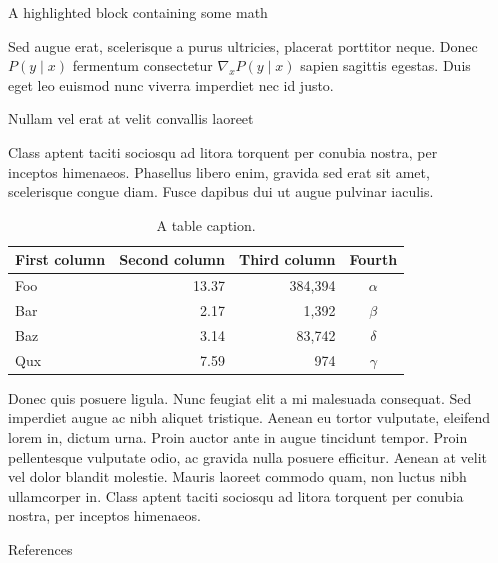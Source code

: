 \documentclass[final]{beamer}
\newlength{\sepwidth}
\newlength{\colwidth}
\newcommand{\separatorcolumn}{\begin{column}{\sepwidth}\end{column}}
\begin{document}
\begin{frame}[t]
\begin{columns}[t]
\begin{column}{\colwidth}
\begin{exampleblock}{A highlighted block containing some math}
					
					Sed augue erat, scelerisque a purus ultricies, placerat porttitor neque.
					Donec $P(y \mid x)$ fermentum consectetur $\nabla_x P(y \mid x)$ sapien
					sagittis egestas. Duis eget leo euismod nunc viverra imperdiet nec id
					justo.
					
				\end{exampleblock}
				
				\begin{block}{Nullam vel erat at velit convallis laoreet}
					
					Class aptent taciti sociosqu ad litora torquent per conubia nostra, per
					inceptos himenaeos. Phasellus libero enim, gravida sed erat sit amet,
					scelerisque congue diam. Fusce dapibus dui ut augue pulvinar iaculis.
					
					\begin{table}
						\centering
						\begin{tabular}{l r r c}
							\toprule
							\textbf{First column} & \textbf{Second column} & \textbf{Third column} & \textbf{Fourth} \\
							\midrule
							Foo & 13.37 & 384,394 & $\alpha$ \\
							Bar & 2.17 & 1,392 & $\beta$ \\
							Baz & 3.14 & 83,742 & $\delta$ \\
							Qux & 7.59 & 974 & $\gamma$ \\
							\bottomrule
						\end{tabular}
						\caption{A table caption.}
					\end{table}
					
					Donec quis posuere ligula. Nunc feugiat elit a mi malesuada consequat. Sed
					imperdiet augue ac nibh aliquet tristique. Aenean eu tortor vulputate,
					eleifend lorem in, dictum urna. Proin auctor ante in augue tincidunt
					tempor. Proin pellentesque vulputate odio, ac gravida nulla posuere
					efficitur. Aenean at velit vel dolor blandit molestie. Mauris laoreet
					commodo quam, non luctus nibh ullamcorper in. Class aptent taciti sociosqu
					ad litora torquent per conubia nostra, per inceptos himenaeos.
					
					
					
				\end{block}
				
				\begin{block}{References}
					
					\nocite{*}
					\footnotesize{}
					
				\end{block}
				
			\end{column}
			
			\separatorcolumn
		\end{columns}
	\end{frame}
	
\end{document}
